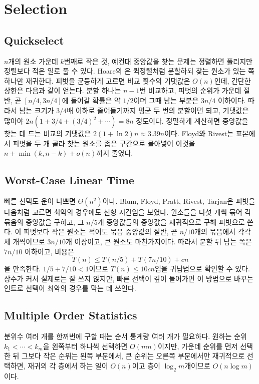 \section{Selection}
\label{sec:selection}

\subsection{Quickselect}

$n$개의 원소 가운데 $k$번째로 작은 것, 예컨대 중앙값을 찾는  문제는 정렬하면 풀리지만 정렬보다 적은 일로 풀 수 있다. Hoare의 은 퀵정렬처럼 분할하되 찾는 원소가 있는 쪽 하나만 재귀한다\cite{hoare1961find}. 피벗을 균등하게 고르면 비교 횟수의 기댓값은 $O(n)$인데, 간단한 상한은 다음과 같이 얻는다. 분할 하나는 $n-1$번 비교하고, 피벗의 순위가 가운데 절반, 곧 $[n/4,3n/4]$에 들어갈 확률은 약 $1/2$이며 그때 남는 부분은 $3n/4$ 이하이다. 따라서 남는 크기가 $3/4$배 이하로 줄어들기까지 평균 두 번의 분할이면 되고, 기댓값은 많아야 $2n(1+3/4+(3/4)^2+\cdots)=8n$ 정도이다. 정밀하게 계산하면 중앙값을 찾는 데 드는 비교의 기댓값은 $2(1+\ln2)n\approx3.39n$이다\cite{knuth1998taocp3}. Floyd와 Rivest는 표본에서 피벗을 두 개 골라 찾는 원소를 좁은 구간으로 몰아넣어 이것을 $n+\min(k,n-k)+o(n)$까지 줄였다\cite{floyd1975}.

\subsection{Worst-Case Linear Time}

빠른 선택도 운이 나쁘면 $\Theta(n^2)$이다. Blum, Floyd, Pratt, Rivest, Tarjan은 피벗을 다음처럼 고르면 최악의 경우에도 선형 시간임을 보였다\cite{blum1973}. 원소들을 다섯 개씩 묶어 각 묶음의 중앙값을 구하고, 그 $n/5$개 중앙값들의 중앙값을 재귀적으로 구해 피벗으로 쓴다. 이 피벗보다 작은 원소는 적어도 묶음 중앙값의 절반, 곧 $n/10$개의 묶음에서 각각 세 개씩이므로 $3n/10$개 이상이고, 큰 원소도 마찬가지이다. 따라서 분할 뒤 남는 쪽은 $7n/10$ 이하이고, 비용은
\[
T(n)\le T(n/5)+T(7n/10)+cn
\]
을 만족한다. $1/5+7/10<1$이므로 $T(n)\le10cn$임을 귀납법으로 확인할 수 있다. 상수가 커서 실제로는 잘 쓰지 않지만, 빠른 선택이 깊이 들어가면 이 방법으로 바꾸는 인트로 선택이 최악의 경우를 막는 데 쓰인다\cite{musser1997}.

\subsection{Multiple Order Statistics}

분위수 여러 개를 한꺼번에 구할 때는 순서 통계량 여러 개가 필요하다. 원하는 순위 $k_1<\cdots<k_m$을 왼쪽부터 하나씩 선택하면 $O(mn)$이지만, 가운데 순위를 먼저 선택한 뒤 그보다 작은 순위는 왼쪽 부분에서, 큰 순위는 오른쪽 부분에서만 재귀적으로 선택하면, 재귀의 각 층에서 하는 일이 $O(n)$이고 층이 $\log_2m$개이므로 $O(n\log m)$이다.

